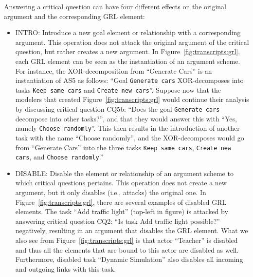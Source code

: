 Answering a critical question can have four different effects on the original argument and the corresponding GRL element:
\begin{itemize} 
\item \textsf{INTRO}: Introduce a new goal element or relationship with a corresponding argument. This operation does not attack the original argument of the critical question, but rather creates a new argument. In Figure~\ref{fig:transcripts:grl}, each GRL element can be seen as the instantiation of an argument scheme. For instance, the XOR-decomposition from ``Generate Cars'' is an instantiation of AS5 as follows: ``Goal \texttt{Generate cars} XOR-decomposes into tasks \texttt{Keep same cars} and \texttt{Create new cars}''. Suppose now that the modelers that created Figure~\ref{fig:transcripts:grl} would continue their analysis by discussing critical question CQ5b: ``Does the goal \texttt{Generate cars} decompose into other tasks?'', and that they would answer this with ``Yes, namely \texttt{Choose randomly}''. This then results in the introduction of another task with the name ``Choose randomly'', and the XOR-decomposes would go from ``Generate Cars'' into the three tasks \texttt{Keep same cars}, \texttt{Create new cars}, and \texttt{Choose randomly}.'' %
\item \textsf{DISABLE:} Disable the element or relationship of an argument scheme to which critical questions pertains. This operation does not create a new argument, but it only disables (i.e., attacks) the original one. In Figure~\ref{fig:transcripts:grl}, there are several examples of disabled GRL elements. The task ``Add traffic light'' (top-left in figure) is attacked by answering critical question CQ2: ``Is task Add traffic light possible?'' negatively, resulting in an argument that disables the GRL element. What we also see from Figure~\ref{fig:transcripts:grl} is that actor ``Teacher'' is disabled and thus all the elements that are bound to this actor are disabled as well. Furthermore, disabled task ``Dynamic Simulation'' also disables all incoming and outgoing links with this task.


\end{itemize}
